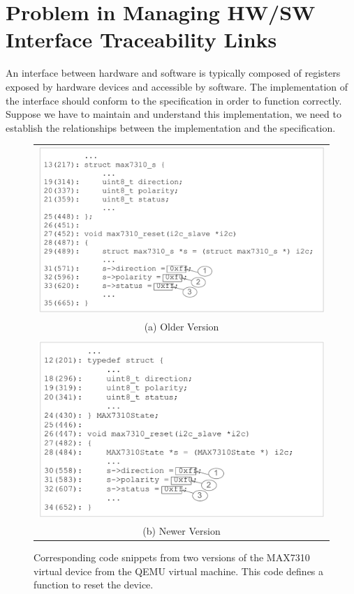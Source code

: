 \section{Problem in Managing HW/SW Interface Traceability Links}
\label{sec:problem}

An interface between hardware and software is typically composed of registers exposed by hardware devices and accessible by software. The implementation of the interface should conform to the specification in order to function correctly. Suppose we have to maintain and understand this implementation, we need to establish the relationships between the implementation and the specification.
\begin{figure}[h!]
  \begin{center}
    \begin{tabular}{c}
\begin{minipage}[b]{\linewidth}
  \centering
  \includegraphics[width=0.8\linewidth]{code1}
\end{minipage}\\
(a) Older Version\\
\\
\begin{minipage}[b]{\linewidth}
  \centering
  \includegraphics[width=0.8\linewidth]{code2}
\end{minipage}\\
(b) Newer Version
\end{tabular}
  \caption{ Corresponding code snippets from two versions of the MAX7310 virtual device from the QEMU virtual machine. This code defines a function to reset the device.}
\label{fig:code}
\end{center}
\end{figure}
